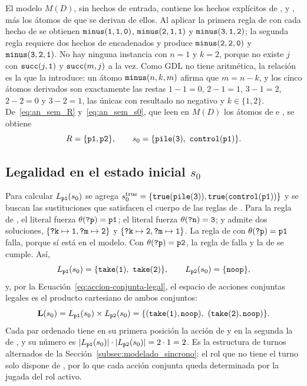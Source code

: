 El modelo $M(D)$, sin hechos de entrada, contiene los hechos explícitos de ,  y , más los átomos de  que se derivan de ellos. Al aplicar la primera regla de  con cada hecho de  se obtienen $\texttt{minus}(\texttt{1}, \texttt{1}, \texttt{0})$, $\texttt{minus}(\texttt{2}, \texttt{1}, \texttt{1})$ y $\texttt{minus}(\texttt{3}, \texttt{1}, \texttt{2})$; la segunda regla requiere dos hechos de  encadenados y produce $\texttt{minus}(\texttt{2}, \texttt{2}, \texttt{0})$ y $\texttt{minus}(\texttt{3}, \texttt{2}, \texttt{1})$. No hay ninguna instancia con $n = 1$ y $k = 2$, porque no existe $j$ con $\texttt{succ}(j, \texttt{1})$ y $\texttt{succ}(m, j)$ a la vez. Como GDL no tiene aritmética, la relación  es la que la introduce: un átomo $\texttt{minus}(n, k, m)$ afirma que $m = n - k$, y los cinco átomos derivados son exactamente las restas $1-1=0$, $2-1=1$, $3-1=2$, $2-2=0$ y $3-2=1$, las únicas con resultado no negativo y $k \in \{1, 2\}$. De~\eqref{eq:an_sem_R} y~\eqref{eq:an_sem_s0}, que leen en $M(D)$ los átomos de  e , se obtiene
\begin{equation*}
    R = \{\texttt{p1}, \texttt{p2}\},
    \qquad
    s_0 = \{\texttt{pile}(\texttt{3}),\ \texttt{control}(\texttt{p1})\}.
\end{equation*}

\subsection{Legalidad en el estado inicial \texorpdfstring{$s_0$}{s0}}

Para calcular $L_{\texttt{p1}}(s_0)$ se agrega $s_0^{\mathrm{true}} = \{\texttt{true}(\texttt{pile}(\texttt{3})), \texttt{true}(\texttt{control}(\texttt{p1}))\}$ y se buscan las sustituciones que satisfacen el cuerpo de las reglas de . Para la regla de , el literal  fuerza $\theta(\texttt{?p}) = \texttt{p1}$; el literal  fuerza $\theta(\texttt{?n}) = \texttt{3}$; y  admite dos soluciones, $\{\texttt{?k} \mapsto \texttt{1}, \texttt{?m} \mapsto \texttt{2}\}$ y $\{\texttt{?k} \mapsto \texttt{2}, \texttt{?m} \mapsto \texttt{1}\}$. La regla de  con $\theta(\texttt{?p}) = \texttt{p1}$ falla, porque  sí está en el modelo. Con $\theta(\texttt{?p}) = \texttt{p2}$, la regla de  falla y la de  se cumple. Así,
\begin{equation*}
    L_{\kw{p1}}(s_0) = \{\kw{take}(\kw 1),\ \kw{take}(\kw 2)\},
    \qquad
    L_{\kw{p2}}(s_0) = \{\kw{noop}\},
\end{equation*}
y, por la Ecuación~\eqref{eq:accion-conjunta-legal}, el espacio de acciones conjuntas legales es el producto cartesiano de ambos conjuntos:
\begin{equation*}
    \mathbf L(s_0) = L_{\texttt{p1}}(s_0) \times L_{\texttt{p2}}(s_0) = \{(\texttt{take}(\texttt{1}), \texttt{noop}),\ (\texttt{take}(\texttt{2}), \texttt{noop})\}.
\end{equation*}
Cada par ordenado tiene en su primera posición la acción de  y en la segunda la de , y su número es $|L_{\texttt{p1}}(s_0)| \cdot |L_{\texttt{p2}}(s_0)| = 2 \cdot 1 = 2$. Es la estructura de turnos alternados de la Sección~\ref{subsec:modelado_sincrono}: el rol que no tiene el turno solo dispone de , por lo que cada acción conjunta queda determinada por la jugada del rol activo.

